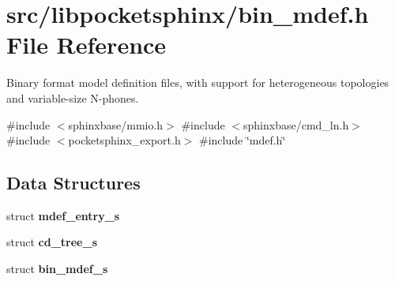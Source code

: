 \section{src/libpocketsphinx/bin\-\_\-mdef.h \-File \-Reference}
\label{bin__mdef_8h}


\-Binary format model definition files, with support for heterogeneous topologies and variable-\/size \-N-\/phones.  


{\ttfamily \#include $<$sphinxbase/mmio.\-h$>$}\*
{\ttfamily \#include $<$sphinxbase/cmd\-\_\-ln.\-h$>$}\*
{\ttfamily \#include $<$pocketsphinx\-\_\-export.\-h$>$}\*
{\ttfamily \#include \char`\"{}mdef.\-h\char`\"{}}\*
\subsection*{\-Data \-Structures}
\begin{DoxyCompactItemize}
\item 
struct {\bf mdef\-\_\-entry\-\_\-s}
\item 
struct {\bf cd\-\_\-tree\-\_\-s}
\item 
struct {\bf bin\-\_\-mdef\-\_\-s}
\end{DoxyCompactItemize}
